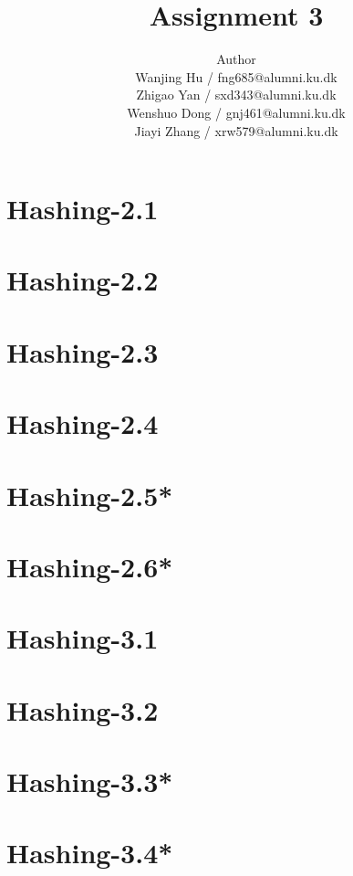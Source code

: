 \documentclass[12pt]{article}
\title{Assignment 3}
\author{Author \\
  Wanjing Hu / fng685@alumni.ku.dk  \\
  Zhigao Yan / sxd343@alumni.ku.dk  \\
  Wenshuo Dong / gnj461@alumni.ku.dk  \\
  Jiayi Zhang / xrw579@alumni.ku.dk \\
}
\begin{document}
\maketitle

\section{Hashing-2.1}

\section{Hashing-2.2}

\section{Hashing-2.3}

\section{Hashing-2.4 }

\section{Hashing-2.5*}

\section{Hashing-2.6*}

\section{Hashing-3.1}

\section{Hashing-3.2}

\section{Hashing-3.3* }

\section{Hashing-3.4*}
\end{document}
